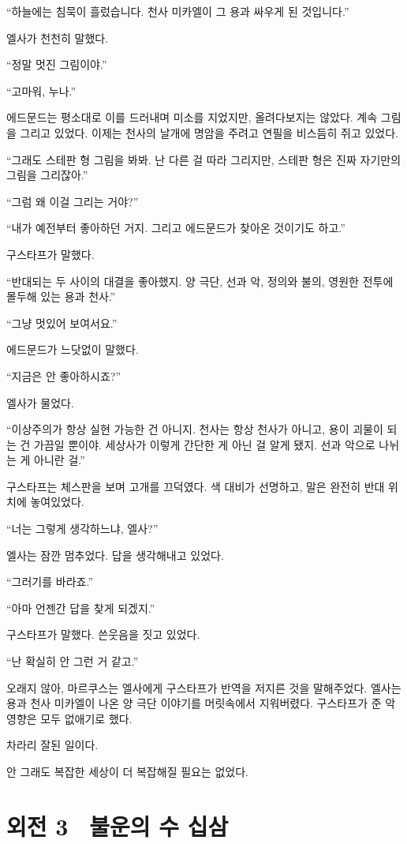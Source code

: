 ``하늘에는 침묵이 흘렀습니다. 천사 미카엘이 그 용과 싸우게 된 것입니다.''

엘사가 천천히 말했다.

``정말 멋진 그림이야.''

``고마워, 누나.''

에드문드는 평소대로 이를 드러내며 미소를 지었지만, 올려다보지는 않았다. 계속 그림을 그리고 있었다. 이제는 천사의 날개에 명암을 주려고 연필을 비스듬히 쥐고 있었다.

``그래도 스테판 형 그림을 봐봐. 난 다른 걸 따라 그리지만, 스테판 형은 진짜 자기만의 그림을 그리잖아.''

``그럼 왜 이걸 그리는 거야?''

``내가 예전부터 좋아하던 거지. 그리고 에드문드가 찾아온 것이기도 하고.''

구스타프가 말했다.

``반대되는 두 사이의 대결을 좋아했지. 양 극단, 선과 악, 정의와 불의, 영원한 전투에 몰두해 있는 용과 천사.''

``그냥 멋있어 보여서요.''

에드문드가 느닷없이 말했다.

``지금은 안 좋아하시죠?''

엘사가 물었다.

``이상주의가 항상 실현 가능한 건 아니지. 천사는 항상 천사가 아니고, 용이 괴물이 되는 건 가끔일 뿐이야. 세상사가 이렇게 간단한 게 아닌 걸 알게 됐지. 선과 악으로 나뉘는 게 아니란 걸.''

구스타프는 체스판을 보며 고개를 끄덕였다. 색 대비가 선명하고, 말은 완전히 반대 위치에 놓여있었다.

``너는 그렇게 생각하느냐, 엘사?''

엘사는 잠깐 멈추었다. 답을 생각해내고 있었다.

``그러기를 바라죠.''

``아마 언젠간 답을 찾게 되겠지.''

구스타프가 말했다. 쓴웃음을 짓고 있었다.

``난 확실히 안 그런 거 같고.''

\textbreak

오래지 않아, 마르쿠스는 엘사에게 구스타프가 반역을 저지른 것을 말해주었다. 엘사는 용과 천사 미카엘이 나온 양 극단 이야기를 머릿속에서 지워버렸다. 구스타프가 준 악영향은 모두 없애기로 했다.

차라리 잘된 일이다.

안 그래도 복잡한 세상이 더 복잡해질 필요는 없었다.



\chapter[외전3. 불운의 수 십삼][외전 3\hspace*{.5em}불운의 수 십삼]{외전 3 \ 불운의 수 십삼}



